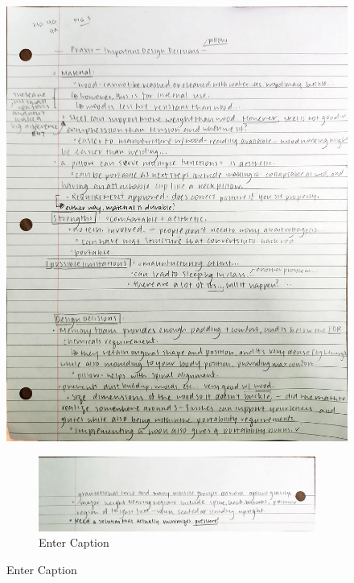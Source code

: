\documentclass[11pt]{article}
\begin{document}
\begin{figure}
    \centering
    \includegraphics[width=1\linewidth]{pro-0jBrI1RE.jpeg}
    \caption{Enter Caption}
    \label{fig:enter-label}
\begin{figure}
    \centering
    \includegraphics[width=1\linewidth]{second.png}
    \caption{Enter Caption}
    \label{fig:enter-label}
\end{figure}
\end{figure}
\end{document}
